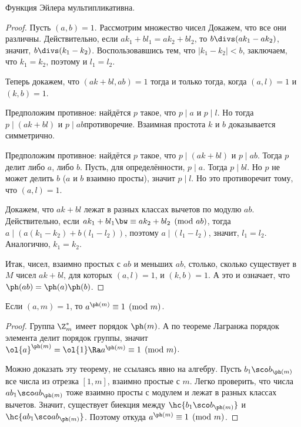 \documentclass[a4paper]{article}
\begin{document}
\begin{lemma}
Функция Эйлера мультипликативна.
\end{lemma}
\begin{proof}
Пусть $(a,b) =1$.
Рассмотрим множество чисел
Докажем, что все они различны. Действительно, если $ak_1+bl_1=ak_2+bl_2$, то $b\divs (ak_1-ak_2)$, значит, $b\divs(k_1-k_2)$.
Воспользовавшись тем, что $|k_1-k_2|<b$, заключаем, что $k_1=k_2$, поэтому и $l_1=l_2$.

Теперь докажем, что $(ak+bl,ab)=1$ тогда и только тогда, когда $(a,l)=1$ и $(k,b)=1$.

\framebox{$\Ra$} Предположим противное: найдётся $p$ такое, что $p\mid a$ и $p \mid l$.
Но тогда $p\mid (ak+bl)$ и $p\mid ab$\т противоречие. Взаимная простота $k$ и $b$ доказывается симметрично.

\framebox{$\Lar$} Предположим противное: найдётся $p$ такое, что $p\mid(ak+bl)$ и $p \mid ab$. Тогда $p$ делит либо $a$, либо $b$. Пусть,
для определённости, $p\mid a$. Тогда $p\mid bl$. Но $p$ не может делить $b$ ( $a$ и $b$ взаимно просты),
значит $p\mid l$. Но это противоречит тому, что $(a,l)=1$.

Докажем, что $ak+bl$ лежат в разных классах вычетов по модулю $ab$. Действительно, если
$ak_1+bl_1\bw\equiv ak_2+bl_2 \pmod{ab}$, тогда $a\mid(a(k_1-k_2)+b(l_1-l_2))$, поэтому $a\mid (l_1-l_2)$, значит, $l_1=l_2$.
Аналогично, $k_1=k_2$.

Итак, чисел, взаимно простых с $ab$ и меньших $ab$, столько, сколько существует в $M$ чисел $ak+bl$,
для которых $(a,l)=1$, и $(k,b)=1$. А это и означает, что $\ph(ab)=\ph(a)\ph(b)$.
\end{proof}

\begin{theorem}[Эйлер]
Если $(a,m)=1$, то $a^{\ph(m)}\equiv1 \pmod{m}$.
\end{theorem}
\begin{proof}
 Группа $\Z_m^*$ имеет порядок $\ph(m)$. А по теореме Лагранжа порядок элемента делит
порядок группы, значит $\ol{a}^{\ph(m)}=\ol{1}\Ra a^{\ph(m)}\equiv1 \pmod{m}$.

 Можно доказать эту теорему, не ссылаясь явно на алгебру. Пусть $b_1\sco b_{\ph(m)}$\т
все числа из отрезка $[1,m]$, взаимно простые с $m$. Легко проверить,
что числа $ab_1\sco ab_{\ph(m)}$ тоже взаимно просты с модулем и лежат в разных классах вычетов. Значит,
существует биекция между $\hc{b_1\sco b_{\ph(m)}}$ и $\hc{ab_1\sco ab_{\ph(m)}}$. Поэтому
откуда $a^{\ph(m)}\equiv1\pmod{m}$.
\end{proof}
\end{document}
